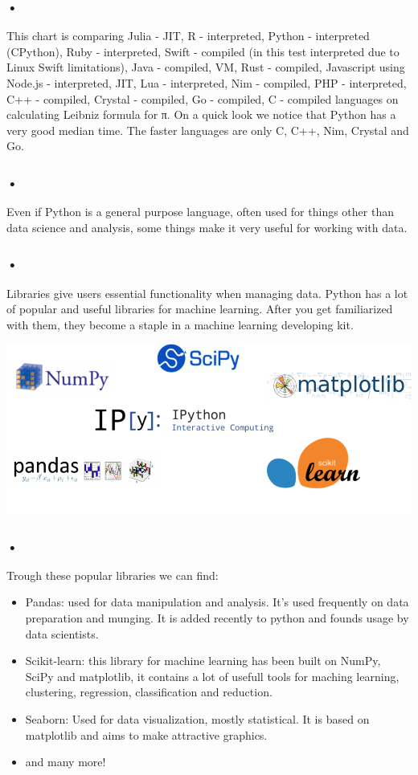 \documentclass{svproc}
\begin{document}
\subsubsection{•}
This chart is comparing Julia - JIT, R - interpreted, Python - interpreted (CPython), Ruby - interpreted, Swift - compiled (in this test interpreted due to Linux Swift limitations), Java - compiled, VM, Rust - compiled, Javascript using Node.js - interpreted, JIT, Lua - interpreted, Nim - compiled, PHP - interpreted, C++ - compiled, Crystal - compiled, Go - compiled, C - compiled languages on calculating Leibniz formula for π. On a quick look we notice that Python has a very good median time. The faster languages are only C, C++, Nim, Crystal and Go.

\subsubsection{•}
Even if Python is a general purpose language, often used for things other than data science and analysis, some things make it very useful for working with data.

\subsubsection{•}
Libraries give users essential functionality when managing data. Python has a lot of popular and useful libraries for machine learning. After you get familiarized with them, they become a staple in a machine learning developing kit.

\bigskip

\includegraphics[scale=0.33]{python-machine-learning-libraries}

\subsubsection{•}
Trough these popular libraries we can find:
\begin{itemize}
	\item Pandas: used for data manipulation and analysis. It’s used frequently on data preparation and munging. It is added recently to python and founds usage by data scientists. 
	\item Scikit-learn: this library for machine learning has been built on NumPy, SciPy and matplotlib, it contains a lot of usefull tools for maching learning, clustering, regression, classification and reduction.
	\item Seaborn: Used for data visualization, mostly statistical. It is based on matplotlib and aims to make attractive graphics.
	\item and many more!
\end{itemize}
\end{document}
